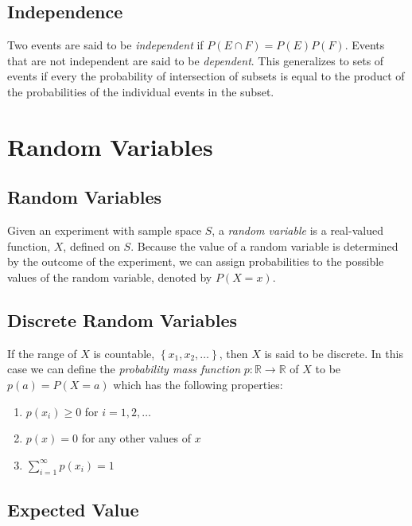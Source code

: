\documentclass[10pt]{article}
\begin{document}
		\subsection*{Independence}
		
		Two events are said to be \emph{independent} if $P(E\cap F) = P(E)P(F)$. Events that are not independent are said to be \emph{dependent}.  This generalizes to sets of events if every the probability of intersection of subsets is equal to the product of the probabilities of the individual events in the subset.
		
		\section{Random Variables}
		
		\subsection*{Random Variables}
		
		Given an experiment with sample space $S$, a \emph{random variable} is a real-valued function, $X$, defined on $S$. Because the value of a random variable is determined by the outcome of the experiment, we can assign probabilities to the possible values of the random variable, denoted by $P(X=x)$.
		
		\subsection*{Discrete Random Variables}
		If the range of $X$ is countable, $\left\{ x_1, x_2, \ldots \right\}$, then $X$ is said to be discrete. In this case we can define the \emph{probability mass function} $p:\mathbb{R}\to\mathbb{R}$ of $X$ to be $p(a) = P(X=a)$ which has the following properties:
		\begin{multicols}{3}
			\begin{enumerate}
				\item $p(x_i) \geq 0$ for $i=1,2,\ldots$
				\item $p(x) = 0$ for any other values of $x$
				\item $\sum_{i=1}^{\infty}p(x_i) = 1$
			\end{enumerate}
		\end{multicols}
		
		\subsection*{Expected Value}
		
\end{document}
